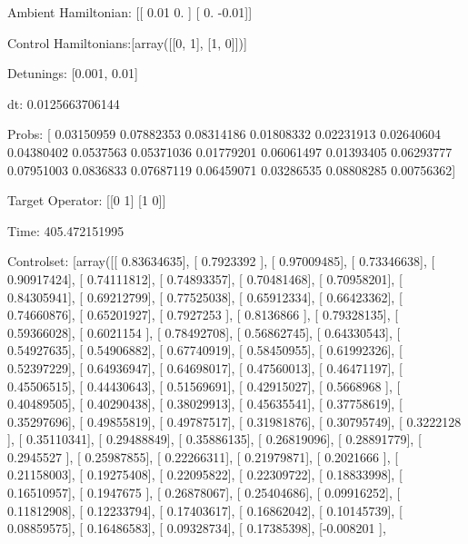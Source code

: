 \documentclass{article}
\begin{document}
    

\newpage

Ambient Hamiltonian: [[ 0.01  0.  ]
 [ 0.   -0.01]]

Control Hamiltonians:[array([[0, 1],
       [1, 0]])]

Detunings: [0.001, 0.01]

 dt: 0.0125663706144

Probs: [ 0.03150959  0.07882353  0.08314186  0.01808332  0.02231913  0.02640604
  0.04380402  0.0537563   0.05371036  0.01779201  0.06061497  0.01393405
  0.06293777  0.07951003  0.0836833   0.07687119  0.06459071  0.03286535
  0.08808285  0.00756362]

Target Operator: [[0 1]
 [1 0]]

Time: 405.472151995

Controlset: [array([[ 0.83634635],
       [ 0.7923392 ],
       [ 0.97009485],
       [ 0.73346638],
       [ 0.90917424],
       [ 0.74111812],
       [ 0.74893357],
       [ 0.70481468],
       [ 0.70958201],
       [ 0.84305941],
       [ 0.69212799],
       [ 0.77525038],
       [ 0.65912334],
       [ 0.66423362],
       [ 0.74660876],
       [ 0.65201927],
       [ 0.7927253 ],
       [ 0.8136866 ],
       [ 0.79328135],
       [ 0.59366028],
       [ 0.6021154 ],
       [ 0.78492708],
       [ 0.56862745],
       [ 0.64330543],
       [ 0.54927635],
       [ 0.54906882],
       [ 0.67740919],
       [ 0.58450955],
       [ 0.61992326],
       [ 0.52397229],
       [ 0.64936947],
       [ 0.64698017],
       [ 0.47560013],
       [ 0.46471197],
       [ 0.45506515],
       [ 0.44430643],
       [ 0.51569691],
       [ 0.42915027],
       [ 0.5668968 ],
       [ 0.40489505],
       [ 0.40290438],
       [ 0.38029913],
       [ 0.45635541],
       [ 0.37758619],
       [ 0.35297696],
       [ 0.49855819],
       [ 0.49787517],
       [ 0.31981876],
       [ 0.30795749],
       [ 0.3222128 ],
       [ 0.35110341],
       [ 0.29488849],
       [ 0.35886135],
       [ 0.26819096],
       [ 0.28891779],
       [ 0.2945527 ],
       [ 0.25987855],
       [ 0.22266311],
       [ 0.21979871],
       [ 0.2021666 ],
       [ 0.21158003],
       [ 0.19275408],
       [ 0.22095822],
       [ 0.22309722],
       [ 0.18833998],
       [ 0.16510957],
       [ 0.1947675 ],
       [ 0.26878067],
       [ 0.25404686],
       [ 0.09916252],
       [ 0.11812908],
       [ 0.12233794],
       [ 0.17403617],
       [ 0.16862042],
       [ 0.10145739],
       [ 0.08859575],
       [ 0.16486583],
       [ 0.09328734],
       [ 0.17385398],
       [-0.008201  ],
\end{document}
